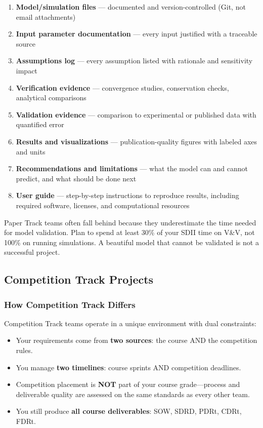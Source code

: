 \begin{enumerate}[nosep,leftmargin=1.5em]
\item \textbf{Model/simulation files} --- documented and version-controlled (Git, not email attachments)
\item \textbf{Input parameter documentation} --- every input justified with a traceable source
\item \textbf{Assumptions log} --- every assumption listed with rationale and sensitivity impact
\item \textbf{Verification evidence} --- convergence studies, conservation checks, analytical comparisons
\item \textbf{Validation evidence} --- comparison to experimental or published data with quantified error
\item \textbf{Results and visualizations} --- publication-quality figures with labeled axes and units
\item \textbf{Recommendations and limitations} --- what the model can and cannot predict, and what should be done next
\item \textbf{User guide} --- step-by-step instructions to reproduce results, including required software, licenses, and computational resources
\end{enumerate}

\begin{warnbox}
Paper Track teams often fall behind because they underestimate the time needed for model validation. Plan to spend at least 30\% of your SDII time on V\&V, not 100\% on running simulations. A beautiful model that cannot be validated is not a successful project.
\end{warnbox}


\subsection{Competition Track Projects}

\subsubsection{How Competition Track Differs}

Competition Track teams operate in a unique environment with dual constraints:

\begin{itemize}[nosep,leftmargin=1.5em]
\item Your requirements come from \textbf{two sources}: the course AND the competition rules.
\item You manage \textbf{two timelines}: course sprints AND competition deadlines.
\item Competition placement is \textbf{NOT} part of your course grade---process and deliverable quality are assessed on the same standards as every other team.
\item You still produce \textbf{all course deliverables}: SOW, SDRD, PDRt, CDRt, FDRt.
\end{itemize}

